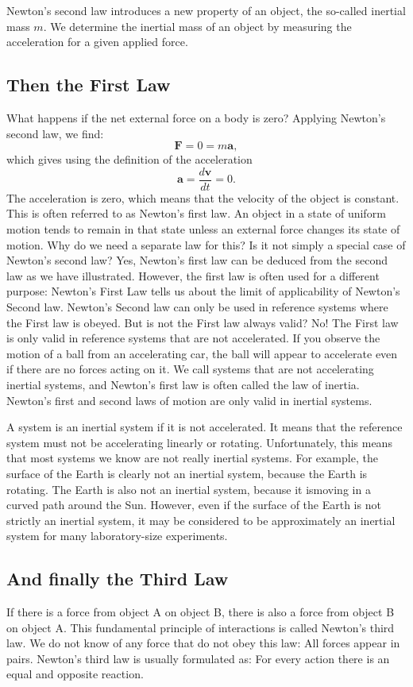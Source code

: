\documentclass[%
oneside,                 %
final,                   %
10pt]{article}
\begin{document}
Newton’s second law introduces a new property of an object, the so-called 
inertial mass $m$. We determine the inertial mass of an object by measuring the
acceleration for a given applied force.

\subsection{Then the First Law}

What happens if the net external force on a body is zero? Applying Newton’s second
law, we find:
\[
\bm{F} = 0 = m\bm{a},
\]
which gives using the definition of the acceleration
\[
\bm{a} = \frac{d\bm{v}}{dt}=0.
\]
The acceleration is zero, which means that the velocity of the object is constant. This
is often referred to as Newton’s first law. An object in a state of uniform motion tends to remain in
that state unless an external force changes its state of motion.
Why do we need a separate law for this? Is it not simply a special case of Newton’s
second law? Yes, Newton’s first law can be deduced from the second law as we have
illustrated. However, the first law is often used for a different purpose: Newton’s
First Law tells us about the limit of applicability of Newton’s Second law. Newton’s
Second law can only be used in reference systems where the First law is obeyed. But
is not the First law always valid? No! The First law is only valid in reference systems
that are not accelerated. If you observe the motion of a ball from an accelerating
car, the ball will appear to accelerate even if there are no forces acting on it. We call
systems that are not accelerating inertial systems, and Newton’s first law is often
called the law of inertia. Newton’s first and second laws of motion are only valid in
inertial systems. 

A system is an inertial system if it is not accelerated. It means that the reference system
must not be accelerating linearly or rotating. Unfortunately, this means that most
systems we know are not really inertial systems. For example, the surface of the
Earth is clearly not an inertial system, because the Earth is rotating. The Earth is also
not an inertial system, because it ismoving in a curved path around the Sun. However,
even if the surface of the Earth is not strictly an inertial system, it may be considered
to be approximately an inertial system for many laboratory-size experiments.

\subsection{And finally the Third Law}

If there is a force from object A on object B, there is also a force from object B on object A.
This fundamental principle of interactions is called Newton’s third law. We do not
know of any force that do not obey this law: All forces appear in pairs. Newton’s
third law is usually formulated as: For every action there is an equal and opposite
reaction.



\end{document}
